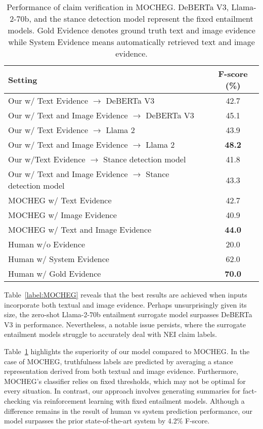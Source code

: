 \begin{table}[!th]\large
\centering
\caption{Performance of claim verification in MOCHEG. DeBERTa V3, Llama-2-70b, and the stance detection model represent the fixed entailment models. Gold Evidence denotes ground truth text and image evidence while System Evidence means automatically retrieved text and image evidence.}
\begin{tabular}{l|c}
\hline
\textbf{Setting}                       & \textbf{F-score (\%)} \\ \hline
Our w/ Text Evidence $\rightarrow$ DeBERTa V3           & 42.7                   \\
Our w/ Text and Image Evidence $\rightarrow$ DeBERTa V3 & 45.1                   \\
Our w/ Text Evidence $\rightarrow$ Llama 2           & 43.9                 \\
Our w/ Text and Image Evidence $\rightarrow$ Llama 2 & \textbf{48.2}                   \\
Our w/Text Evidence $\rightarrow$ Stance detection model & 41.8\\
Our w/ Text and Image Evidence $\rightarrow$ Stance detection model & 43.3\\
\hline
MOCHEG w/ Text Evidence                 & 42.7                \\
MOCHEG w/ Image Evidence                & 40.9                \\
MOCHEG w/ Text and Image Evidence       & \textbf{44.0}                \\ \hline
Human w/o Evidence                      & 20.0                \\
Human w/ System Evidence                & 62.0                \\
Human w/ Gold Evidence                  & \textbf{70.0}                \\ \hline
\end{tabular}
\label{label:claim_verification_fscore_MOCHEG}
\end{table}

Table~\ref{label:MOCHEG} reveals that the best results are achieved when inputs incorporate both textual and image evidence. Perhaps unsurprisingly given its size, the zero-shot Llama-2-70b entailment surrogate model surpasses DeBERTa V3 in performance. Nevertheless, a notable issue persists, where the surrogate entailment models struggle to accurately deal with NEI claim labels.

Table~\ref{label:claim_verification_fscore_MOCHEG} highlights the superiority of our model compared to MOCHEG. In the case of MOCHEG, truthfulness labels are predicted by averaging a stance representation derived from both textual and image evidence. Furthermore, MOCHEG's classifier relies on fixed thresholds, which may not be optimal for every situation. In contrast, our approach involves generating summaries for fact-checking via reinforcement learning with fixed entailment models. Although a difference remains in the result of human vs system prediction performance, our model surpasses the prior state-of-the-art system by 4.2\% F-score.

